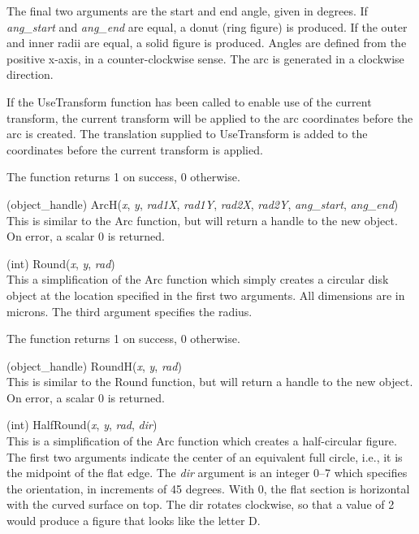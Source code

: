 \begin{description}
The final two arguments are the start and end angle, given in degrees. 
If {\it ang\_start\/} and {\it ang\_end\/} are equal, a donut (ring
figure) is produced.  If the outer and inner radii are equal, a solid
figure is produced.  Angles are defined from the positive x-axis, in a
counter-clockwise sense.  The arc is generated in a clockwise
direction.

If the {\vt UseTransform} function has been called to enable use of
the current transform, the current transform will be applied to the
arc coordinates before the arc is created.  The translation supplied
to {\vt UseTransform} is added to the coordinates before the current
transform is applied.

The function returns 1 on success, 0 otherwise.

\item{(object\_handle) \vt ArcH({\it x\/}, {\it y\/}, {\it rad1X\/},
 {\it rad1Y\/}, {\it rad2X\/}, {\it rad2Y\/}, {\it ang\_start\/},
 {\it ang\_end\/})}\\
This is similar to the {\vt Arc} function, but will return a handle to
the new object.  On error, a scalar 0 is returned.


\item{(int) \vt Round({\it x\/}, {\it y\/}, {\it rad\/})}\\
This a simplification of the {\vt Arc} function which simply creates a
circular disk object at the location specified in the first two
arguments.  All dimensions are in microns.  The third argument
specifies the radius.
  
The function returns 1 on success, 0 otherwise.

\item{(object\_handle) \vt RoundH({\it x\/}, {\it y\/}, {\it rad\/})}\\
This is similar to the {\vt Round} function, but will return a handle
to the new object.  On error, a scalar 0 is returned.

\item{(int) \vt HalfRound({\it x\/}, {\it y\/}, {\it rad\/},
 {\it dir\/})}\\
This is a simplification of the {\vt Arc} function which creates a
half-circular figure.  The first two arguments indicate the center of
an equivalent full circle, i.e., it is the midpoint of the flat edge. 
The {\it dir} argument is an integer 0--7 which specifies the
orientation, in increments of 45 degrees.  With 0, the flat section is
horizontal with the curved surface on top.  The dir rotates clockwise,
so that a value of 2 would produce a figure that looks like the letter
D.
  

\end{description}

